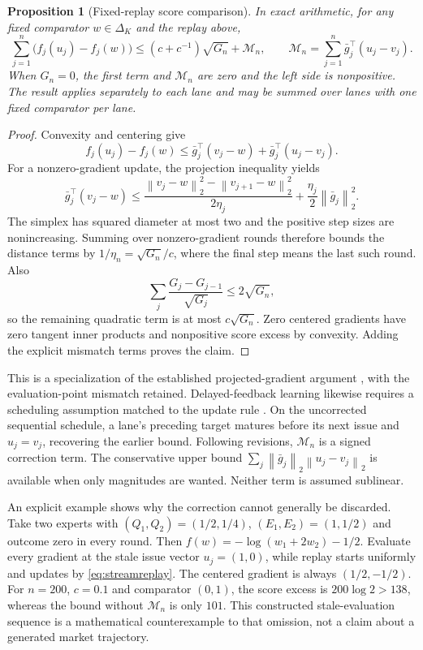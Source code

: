 \documentclass[11pt,a4paper]{article}
\newtheorem{proposition}[theorem]{Proposition}
\theoremstyle{definition}\newtheorem{definition}[theorem]{Definition}
\newcommand{\norm}[1]{\left\lVert#1\right\rVert}
\begin{document}
\begin{proposition}[Fixed-replay score comparison]\label{prop:streamregret}
In exact arithmetic, for any fixed comparator $w\in\Delta_K$ and the replay above,
\begin{equation}
 \sum_{j=1}^n\bigl(f_j(u_j)-f_j(w)\bigr)
 \leq (c+c^{-1})\sqrt{G_n}+\mathcal{M}_n,
 \qquad
 \mathcal{M}_n=\sum_{j=1}^n\bar g_j^\top(u_j-v_j).
 \label{eq:streambound}
\end{equation}
When $G_n=0$, the first term and $\mathcal{M}_n$ are zero and the left side is nonpositive. The result applies separately to each lane and may be summed over lanes with one fixed comparator per lane.
\end{proposition}
\begin{proof}
Convexity and centering give
\[
 f_j(u_j)-f_j(w)\leq
 \bar g_j^\top(v_j-w)+\bar g_j^\top(u_j-v_j).
\]
For a nonzero-gradient update, the projection inequality yields
\[
 \bar g_j^\top(v_j-w)\leq
 \frac{\norm{v_j-w}_2^2-\norm{v_{j+1}-w}_2^2}{2\eta_j}
 +\frac{\eta_j}{2}\norm{\bar g_j}_2^2.
\]
The simplex has squared diameter at most two and the positive step sizes are nonincreasing. Summing over nonzero-gradient rounds therefore bounds the distance terms by $1/\eta_n=\sqrt{G_n}/c$, where the final step means the last such round. Also
\[
 \sum_j\frac{G_j-G_{j-1}}{\sqrt{G_j}}\leq2\sqrt{G_n},
\]
so the remaining quadratic term is at most $c\sqrt{G_n}$. Zero centered gradients have zero tangent inner products and nonpositive score excess by convexity. Adding the explicit mismatch terms proves the claim.
\end{proof}

This is a specialization of the established projected-gradient argument \cite{zinkevich2003online}, with the evaluation-point mismatch retained. Delayed-feedback learning likewise requires a scheduling assumption matched to the update rule \cite{joulani2013delayed}. On the uncorrected sequential schedule, a lane's preceding target matures before its next issue and $u_j=v_j$, recovering the earlier bound. Following revisions, $\mathcal{M}_n$ is a signed correction term. The conservative upper bound $\sum_j\norm{\bar g_j}_2\norm{u_j-v_j}_2$ is available when only magnitudes are wanted. Neither term is assumed sublinear.

An explicit example shows why the correction cannot generally be discarded. Take two experts with $(Q_1,Q_2)=(1/2,1/4)$, $(E_1,E_2)=(1,1/2)$ and outcome zero in every round. Then $f(w)=-\log(w_1+2w_2)-1/2$. Evaluate every gradient at the stale issue vector $u_j=(1,0)$, while replay starts uniformly and updates by \eqref{eq:streamreplay}. The centered gradient is always $(1/2,-1/2)$. For $n=200$, $c=0.1$ and comparator $(0,1)$, the score excess is $200\log2>138$, whereas the bound without $\mathcal{M}_n$ is only $101$. This constructed stale-evaluation sequence is a mathematical counterexample to that omission, not a claim about a generated market trajectory.
\end{document}
